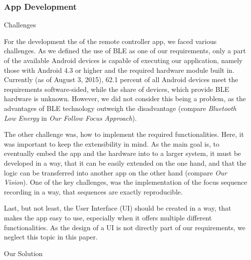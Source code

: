 \documentclass{sigchi}
\begin{document}
\subsubsection{App Development}
Challenges

For the development the of the remote controller app, we faced various challenges. As we defined the use of BLE as one of our requirements, only a part of the available Android devices is capable of executing our application, namely those with Android 4.3 or higher and the required hardware module built in. Currently (as of August 3, 2015), 62.1 percent of all Android devices meet the requirements software-sided, while the share of devices, which provide BLE hardware is unknown. \cite{devand} However, we did not consider this being a problem, as the advantages of BLE technology outweigh the disadvantage (compare \textit{Bluetooth Low Energy} in \textit{Our Follow Focus Approach}).

The other challenge was, how to implement the required functionalities. Here, it was important to keep the extensibility in mind. As the main goal is, to eventually embed the app and the hardware into to a larger system, it must be developed in a way, that it can be easily extended on the one hand, and that the logic can be transferred into another app on the other hand (compare \textit{Our Vision}). One of the key challenges, was the implementation of the focus sequence recording in a way, that sequences are exactly reproducible. 

Last, but not least, the User Interface (UI) should be created in a way, that makes the app easy to use, especially when it offers multiple different functionalities. As the design of a UI is not directly part of our requirements, we neglect this topic in this paper. 


Our Solution
\end{document}
